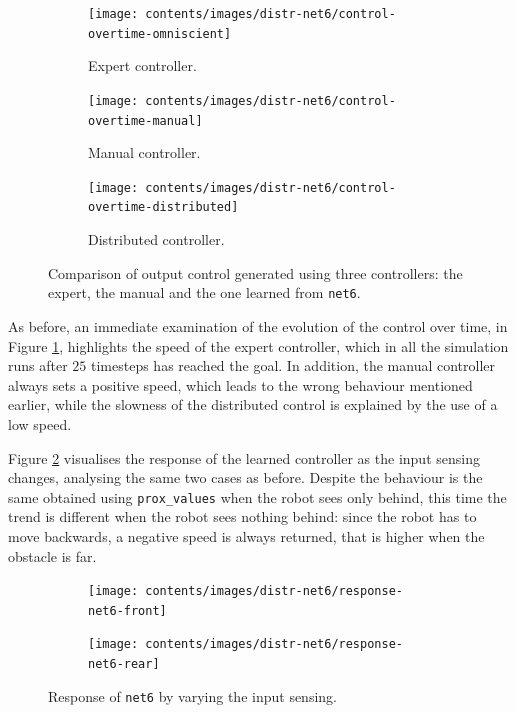 \begin{figure}[!htb]
	\centering
	\begin{subfigure}[h]{0.3\textwidth}
		\centering
		\texttt{[image: contents/images/distr-net6/control-overtime-omniscient]}%
		\caption{Expert controller.}
	\end{subfigure}
	\hfill
	\begin{subfigure}[h]{0.3\textwidth}
		\centering
		\texttt{[image: contents/images/distr-net6/control-overtime-manual]}%
		\caption{Manual controller.}
	\end{subfigure}
	\hfill
	\begin{subfigure}[h]{0.3\textwidth}
		\centering
		\texttt{[image: contents/images/distr-net6/control-overtime-distributed]}
		\caption{Distributed controller.}
	\end{subfigure}
	\caption[Evaluation of the control learned by \texttt{net6}.]{Comparison 
		of output control generated using three controllers: the expert, the manual 
		and the one learned from \texttt{net6}.}
	\label{fig:net6control}
\end{figure}

As before, an immediate examination of the evolution of the control over 
time, in Figure \ref{fig:net6control}, highlights the speed of the expert 
controller, which in all the simulation runs after $25$ timesteps has reached the 
goal. 
In addition, the manual controller always sets a positive speed, which leads to the 
wrong behaviour mentioned earlier, while the slowness of the distributed control 
is explained by the use of a low speed.

Figure \ref{fig:net6responsesensors} visualises the response of the learned 
controller as the input sensing changes, analysing the same two cases as before. 
Despite the behaviour is the same obtained using \texttt{prox\_values} when the 
robot sees only behind, this time the trend is different when the robot sees 
nothing behind: since the robot has to move backwards, a negative speed is 
always returned, that is higher when the obstacle is far. 
\begin{figure}[!htb]
	\centering
	\begin{subfigure}[h]{0.49\textwidth}
		\centering
		\texttt{[image: contents/images/distr-net6/response-net6-front]}%
	\end{subfigure}
	\hfill
	\begin{subfigure}[h]{0.49\textwidth}
		\centering
		\texttt{[image: contents/images/distr-net6/response-net6-rear]}
	\end{subfigure}
	\caption{Response of \texttt{net6} by varying the input sensing.}
	\label{fig:net6responsesensors}
\end{figure}

